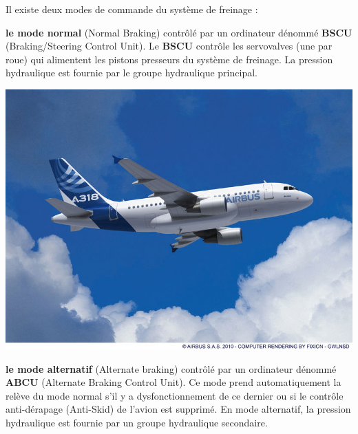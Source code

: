 Il existe deux modes de commande du système de freinage :
\begin{itemize}
\begin{minipage}{0.6\linewidth}
 \item \textbf{le mode normal} (Normal Braking) contrôlé par un ordinateur dénommé \textbf{BSCU} (Braking/Steering Control Unit). Le \textbf{BSCU} contrôle les servovalves (une par roue) qui alimentent les pistons presseurs du système de freinage. La pression hydraulique est fournie par le groupe hydraulique principal.
\end{minipage}
\hfill
\begin{minipage}{0.38\linewidth}
 \centering\includegraphics[width=0.7\linewidth]{img/A318.jpg}
 \vspace{0.5cm}
\end{minipage}
 \item \textbf{le mode alternatif} (Alternate braking) contrôlé par un ordinateur dénommé \textbf{ABCU} (Alternate Braking Control Unit). Ce mode prend automatiquement la relève du mode normal s'il y a dysfonctionnement de ce dernier ou si le contrôle anti-dérapage (Anti-Skid) de l'avion est supprimé. En mode alternatif, la pression hydraulique est fournie par un groupe hydraulique secondaire.
\end{itemize}


